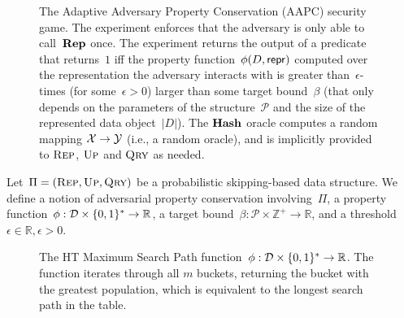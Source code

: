 \begin{figure}[h]
\begin{pchstack}[boxed,center,space=0.5em]
\begin{pcvstack}[space=0.45em]
	\end{pcvstack}
 \end{pchstack}


  \caption[The AAPC Security Model.]{The Adaptive Adversary Property Conservation (AAPC) security game. The experiment enforces that the adversary is only able to call~$\textup{\textbf{Rep}}\hspace{0.5pt}$ once. The experiment returns the output of a predicate that returns~$1$ iff the property function~$\phi(D,\mathsf{repr})$ computed over the representation the adversary interacts with is greater than~$\epsilon$-times (for some~$\epsilon > 0$) larger than some target bound~$\beta$ (that only depends on the parameters of the structure~$\mathcal{P}$ and the size of the represented data object~$|D|$). The $\textup{\textbf{Hash}}\hspace{0.5pt}$ oracle computes a random mapping $\mathcal{X}\to\mathcal{Y}$ (i.e., a random oracle), and is implicitly provided to $\textnormal{\textsc{Rep}}$, $\textnormal{\textsc{Up}}$ and $\textnormal{\textsc{Qry}}$ as needed.}
  \label{fig:aapc}
\end{figure}

Let~$\Pi = (\textnormal{\textsc{Rep}},\textnormal{\textsc{Up}},\textnormal{\textsc{Qry}})$ be a probabilistic skipping-based  data structure. We define a notion of adversarial property conservation involving~$\Pi$, a property function~$\phi : \mathcal{D} \times \{0,1\}^{*} \rightarrow \mathbb{R}$, a target bound~$\beta : \mathcal{P} \times \mathbb{Z}^{+} \rightarrow \mathbb{R}$, and a threshold $\epsilon \in \mathbb{R},\epsilon > 0$.   


\begin{figure}[h]
            \centering
            \begin{pchstack}[boxed,center,space=0.5em]
            \end{pchstack}
      \caption[HT Maximum Search Path.]{The HT Maximum Search Path function~$\phi : \mathcal{D} \times \{0,1 \}^{*} \rightarrow  \mathbb{R}$. The function iterates through all $m$ buckets, returning the bucket with the greatest population, which is equivalent to the longest search path in the table.
      } 
      \label{fig:ht-pop}
\end{figure}

